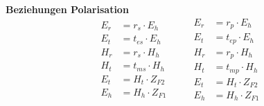\textbf{Beziehungen Polarisation}
\begin{equation*}
\begin{aligned}
	E_r & = r_s \cdot E_h    \\
	E_t & = t_{es} \cdot E_h \\
	H_r & = r_s \cdot H_h    \\
	H_t & = t_{ms} \cdot H_h \\
	E_t & = H_t\cdot Z_{F2}  \\
	E_h & = H_h\cdot Z_{F1}
\end{aligned}
\qquad
\begin{aligned}
    E_r & = r_p\cdot E_h    \\
    E_t & = t_{ep}\cdot E_h \\
    H_r & = r_p\cdot H_h    \\
    H_t & = t_{mp}\cdot H_h \\
    E_t & = H_t\cdot Z_{F2} \\
    E_h & = H_h\cdot Z_{F1} 
\end{aligned}
\end{equation*}

